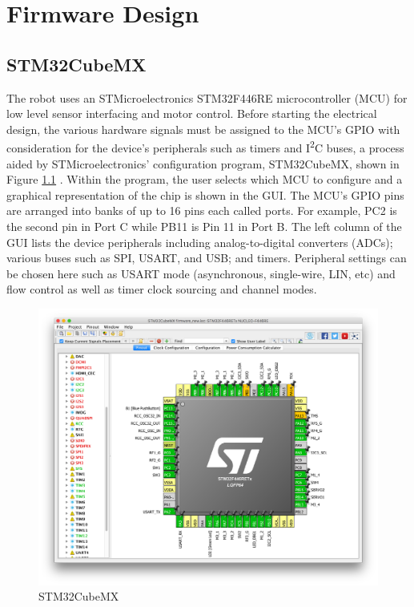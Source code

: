 \chapter{Firmware Design}
\section{STM32CubeMX}
The robot uses an STMicroelectronics STM32F446RE microcontroller (MCU) for low level sensor interfacing and motor control. Before starting the electrical design, the various hardware signals must be assigned to the MCU's GPIO with consideration for the device's peripherals such as timers and I\textsuperscript{2}C buses, a process aided by STMicroelectronics' configuration program, STM32CubeMX, shown in Figure \ref{fig:stm32cubemx} \cite{stm32cubemx}. Within the program, the user selects which MCU to configure and a graphical representation of the chip is shown in the GUI. The MCU's GPIO pins are arranged into banks of up to 16 pins each called ports. For example, PC2 is the second pin in Port C while PB11 is Pin 11 in Port B. The left column of the GUI lists the device peripherals including analog-to-digital converters (ADCs); various buses such as SPI, USART, and USB; and timers. Peripheral settings can be chosen here such as USART mode (asynchronous, single-wire, LIN, etc) and flow control as well as timer clock sourcing and channel modes.
\begin{figure}[H]   %
	\centering \includegraphics[width=6in, keepaspectratio]{figures/stm32cubemx.png}
	\caption{STM32CubeMX}\label{fig:stm32cubemx}
\end{figure}

